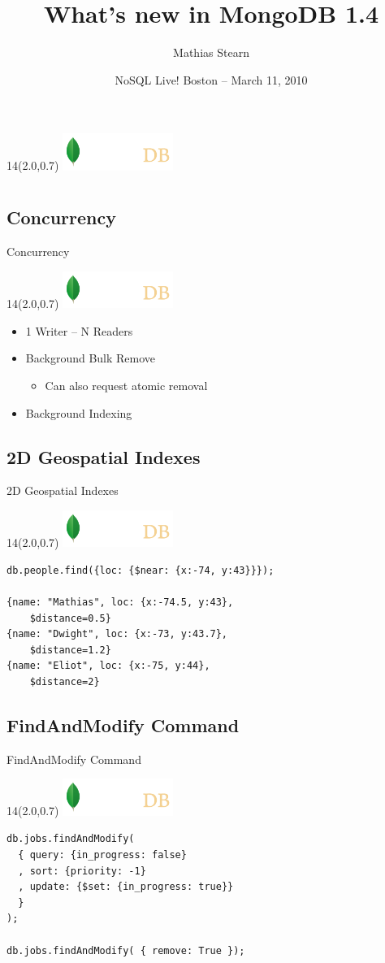 \documentclass{beamer}
\title{What's new in MongoDB 1.4}
\author{Mathias Stearn}
\institute{10gen}
\date{NoSQL Live! Boston -- March 11, 2010}
\newcommand{\MongoLogo}{
\begin{textblock}{14}(2.0,0.7)
  \includegraphics[height=1.2cm]{logo-mongodb-ondark.png}
\end{textblock}
}
\begin{document}
\begin{frame}
  \MongoLogo
  \titlepage
\end{frame}

\section{}
\subsection{Concurrency}
\begin{frame}{Concurrency}
  \MongoLogo
  \begin{itemize}
    \item 1 Writer -- N Readers
    \item Background Bulk Remove
      \begin{itemize}
        \item Can also request atomic removal
      \end{itemize}
    \item Background Indexing
  \end{itemize}
\end{frame}

\subsection{2D Geospatial Indexes}
\begin{frame}[fragile]{2D Geospatial Indexes}
  \MongoLogo

  \begin{verbatim}
db.people.find({loc: {$near: {x:-74, y:43}}});

{name: "Mathias", loc: {x:-74.5, y:43},
    $distance=0.5}
{name: "Dwight", loc: {x:-73, y:43.7},
    $distance=1.2}
{name: "Eliot", loc: {x:-75, y:44},
    $distance=2}
  \end{verbatim}

\end{frame}

\subsection{FindAndModify Command}
\begin{frame}[fragile]{FindAndModify Command}
  \MongoLogo
  \begin{verbatim}
db.jobs.findAndModify(
  { query: {in_progress: false}
  , sort: {priority: -1}
  , update: {$set: {in_progress: true}}
  }
);

db.jobs.findAndModify( { remove: True });
  \end{verbatim}
\end{frame}
\end{document}
